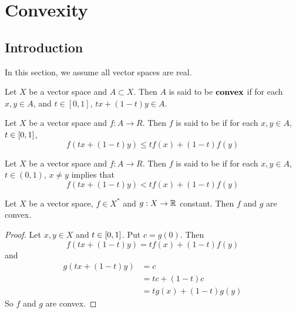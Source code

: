 \documentclass{book}
\begin{document}
	

	
	
	
	
	
	
	\newpage
	\chapter{Convexity}
	
	\section{Introduction}

	\begin{note}
	In this section, we assume all vector spaces are real.
	\end{note}

	\begin{defn} 
	Let $X$ be a vector space and $A \subset X$. Then $A$ is said to be $\textbf{convex}$ if for each $x, y \in A$, and $t \in [0,1]$,  $tx + (1-t)y \in A$. 
	\end{defn}	
	
	\begin{defn} 
	Let $X$ be a vector space and $f:A \rightarrow R$. Then $f$ is said to be  if for each $x,y \in A$, $t \in [0,1]$, $$f(tx + (1-t)y) \leq tf(x) + (1-t)f(y)$$
	\end{defn}
	
	\begin{defn} 
	Let $X$ be a vector space and $f:A \rightarrow R$. Then $f$ is said to be  if for each $x,y \in A$, $t \in (0,1)$, $x \neq y$ implies that $$f(tx + (1-t)y) < tf(x) + (1-t)f(y)$$
	\end{defn}
	
	\begin{ex} 
	Let $X$ be a vector space, $f \in X^*$ and $g: X \rightarrow \mathbb{R}$ constant. Then $f$ and $g$ are convex. 
	\end{ex}
	
	\begin{proof}
		Let $x, y \in X$ and $t \in [0,1]$. Put $c = g(0)$. Then $$f(tx + (1-t)y) = tf(x) + (1-t)f(y)$$ and 
		\begin{align*}
		g(tx + (1-t)y) 
		&= c\\ 
		&= tc + (1-t)c \\
		&= tg(x) + (1-t)g(y)
		\end{align*}
		So $f$ and $g$ are convex.
	\end{proof}		
\end{document}
